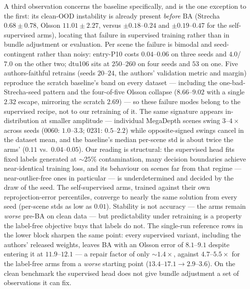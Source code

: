 \documentclass{article}
\begin{document}
A third observation concerns the baseline specifically, and is the one exception to the
first: its clean-OOD instability is already present \emph{before} BA (Strecha
$0.68\pm0.78$, Olsson $11.01\pm2.27$, versus $\pm0.18$--$0.24$ and $\pm0.19$--$0.47$ for
the self-supervised arms), locating that failure in supervised training rather than in
bundle adjustment or evaluation. Per scene the failure is bimodal and seed-contingent
rather than noisy: entry-P10 costs $0.04$--$0.06$ on three seeds and $4.0$/$7.0$ on the
other two; dtu106 sits at $250$--$260$ on four seeds and $53$ on one. Five
authors-faithful retrains (seeds $20$--$24$, the authors' validation metric and margin)
reproduce the scratch baseline's band on every dataset --- including the
one-bad-Strecha-seed pattern and the four-of-five Olsson collapse ($8.66$--$9.02$ with a
single $2.32$ escape, mirroring the scratch $2.69$) --- so these failure modes belong to
the supervised recipe, not to our retraining of it. The same signature
appears in-distribution at smaller amplitude --- individual MegaDepth scenes swing
$3$--$4\times$ across seeds (0060: $1.0$--$3.3$; 0231: $0.5$--$2.2$) while opposite-signed
swings cancel in the dataset mean, and the baseline's median per-scene std is about twice
the arms' ($0.11$ vs.\ $0.04$--$0.05$). Our reading is structural: the supervised head
fits fixed labels generated at ${\sim}25\%$ contamination, many decision boundaries
achieve near-identical training loss, and its behaviour on scenes far from that regime
--- near-outlier-free ones in particular --- is underdetermined and decided by the draw
of the seed. The self-supervised arms, trained against their own reprojection-error
percentiles, converge to nearly the same solution from every seed (per-scene stds as low
as $0.01$). Stability is not accuracy --- the arms remain \emph{worse} pre-BA on clean
data --- but predictability under retraining is a property the label-free objective buys
that labels do not. The single-run reference rows in the lower block
sharpen the same point: every supervised variant, including the authors' released
weights, leaves BA with an Olsson error of $8.1$--$9.1$ despite entering it at
$11.9$--$12.1$ --- a repair factor of only ${\sim}1.4\times$, against $4.7$--$5.5\times$
for the label-free arms from a \emph{worse} starting point ($13.4$--$17.1 \to
2.9$--$3.6$). On the clean benchmark the supervised head does not give bundle adjustment
a set of observations it can fix.
\end{document}
